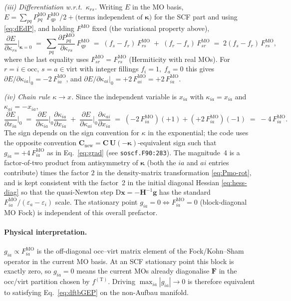 \documentclass[11pt,a4paper]{article}
\newcommand{\kkappa}{\bm{\kappa}}
\newcommand{\xx}{\mathbf{x}}
\newcommand{\gg}{\mathbf{g}}
\newcommand{\HH}{\mathbf{H}}
\newcommand{\FF}{\mathbf{F}}
\newcommand{\CC}{\mathbf{C}}
\newcommand{\UU}{\mathbf{U}}
\begin{document}
\emph{(iii) Differentiation w.r.t.\ $\kappa_{rs}$.}
Writing $E$ in the MO basis, $E = \sum_{pq} P^\mathrm{MO}_{pq} F^\mathrm{MO}_{qp}/2 + \text{(terms independent of } \kkappa)$ for the SCF part and using
\eqref{eq:dEdP}, and holding $F^\mathrm{MO}$ fixed (the variational
property above),
\begin{equation}
\frac{\partial E}{\partial \kappa_{rs}}\bigg|_{\kkappa=0}
\;=\; \sum_{pq}\frac{\partial P^\mathrm{MO}_{pq}}{\partial \kappa_{rs}}\,F^\mathrm{MO}_{qp}
\;=\; (f_s - f_r)\,F^\mathrm{MO}_{rs} \;+\; (f_r - f_s)\,F^\mathrm{MO}_{sr}
\;=\; 2(f_s-f_r)\,F^\mathrm{MO}_{rs},
\label{eq:dEdkappa}
\end{equation}
where the last equality uses $F^\mathrm{MO}_{sr}=F^\mathrm{MO}_{rs}$
(Hermiticity with real MOs). For $r=i\in\mathrm{occ}$, $s=a\in\mathrm{virt}$
with integer fillings $f_i=1,\;f_a=0$ this gives
$\partial E/\partial\kappa_{ia}\big|_0 = -2\,F^\mathrm{MO}_{ia}$, and
$\partial E/\partial\kappa_{ai}\big|_0 = +2\,F^\mathrm{MO}_{ai} = +2\,F^\mathrm{MO}_{ia}$.

\emph{(iv) Chain rule $\kappa\to x$.}
Since the independent variable is $x_{ia}$ with
$\kappa_{ia}=x_{ia}$ and $\kappa_{ai}=-x_{ia}$,
\begin{equation}
\frac{\partial E}{\partial x_{ia}}\bigg|_{0}
\;=\; \frac{\partial E}{\partial \kappa_{ia}}\bigg|_{0}\frac{\partial \kappa_{ia}}{\partial x_{ia}}
\;+\; \frac{\partial E}{\partial \kappa_{ai}}\bigg|_{0}\frac{\partial \kappa_{ai}}{\partial x_{ia}}
\;=\; (-2\,F^\mathrm{MO}_{ia})(+1) + (+2\,F^\mathrm{MO}_{ia})(-1)
\;=\; -4\,F^\mathrm{MO}_{ia}.
\end{equation}
The sign depends on the sign convention for $\kappa$ in the
exponential; the code uses the opposite convention $\CC_\mathrm{new}=\CC\,\UU(-\kkappa)$-equivalent sign
such that $g_{ia}=+4\,F^\mathrm{MO}_{ia}$ as in Eq.~\eqref{eq:grad} (see
\texttt{soscf.F90:283}). The magnitude~4 is a factor-of-two product
from antisymmetry of $\kkappa$ (both the $ia$ and $ai$ entries
contribute) times the factor $2$ in the density-matrix transformation
\eqref{eq:Pmo-rot}, and is kept consistent with the factor~2 in the
initial diagonal Hessian \eqref{eq:hess-diag} so that the quasi-Newton
step $\mathrm{D}\xx=-\HH^{-1}\gg$ has the standard
$F^\mathrm{MO}_{ia}/(\varepsilon_a-\varepsilon_i)$ scale. The
stationary point $g_{ia}=0 \Leftrightarrow F^\mathrm{MO}_{ia}=0$
(block-diagonal MO Fock) is independent of this overall prefactor.

\paragraph{Physical interpretation.}
$g_{ia}\propto F^\mathrm{MO}_{ia}$ is the off-diagonal occ--virt
matrix element of the Fock/Kohn--Sham operator in the current MO
basis. At an SCF stationary point this block is exactly zero, so
$g_{ia}=0$ means the current MOs already diagonalise $\FF$ in the
occ/virt partition chosen by $f^{(\mathrm{T})}$. Driving
$\max_{ia}|g_{ia}|\to 0$ is therefore equivalent to satisfying
Eq.~\eqref{eq:dftbGEP} on the non-Aufbau manifold.
\end{document}

